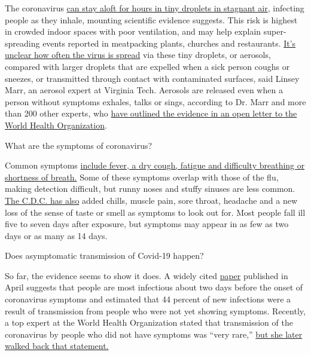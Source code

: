 The coronavirus
\href{https://www.nytimes.com/2020/07/04/health/239-experts-with-one-big-claim-the-coronavirus-is-airborne.html}{can
stay aloft for hours in tiny droplets in stagnant air}, infecting people
as they inhale, mounting scientific evidence suggests. This risk is
highest in crowded indoor spaces with poor ventilation, and may help
explain super-spreading events reported in meatpacking plants, churches
and restaurants.
\href{https://www.nytimes.com/2020/07/06/health/coronavirus-airborne-aerosols.html}{It's
unclear how often the virus is spread} via these tiny droplets, or
aerosols, compared with larger droplets that are expelled when a sick
person coughs or sneezes, or transmitted through contact with
contaminated surfaces, said Linsey Marr, an aerosol expert at Virginia
Tech. Aerosols are released even when a person without symptoms exhales,
talks or sings, according to Dr. Marr and more than 200 other experts,
who
\href{https://academic.oup.com/cid/article/doi/10.1093/cid/ciaa939/5867798}{have
outlined the evidence in an open letter to the World Health
Organization}.

 What are the symptoms of coronavirus?

Common symptoms
\href{https://www.nytimes.com/article/symptoms-coronavirus.html}{include
fever, a dry cough, fatigue and difficulty breathing or shortness of
breath.} Some of these symptoms overlap with those of the flu, making
detection difficult, but runny noses and stuffy sinuses are less common.
\href{https://www.nytimes.com/2020/04/27/health/coronavirus-symptoms-cdc.html}{The
C.D.C. has also} added chills, muscle pain, sore throat, headache and a
new loss of the sense of taste or smell as symptoms to look out for.
Most people fall ill five to seven days after exposure, but symptoms may
appear in as few as two days or as many as 14 days.

 Does asymptomatic transmission of Covid-19 happen?

So far, the evidence seems to show it does. A widely cited
\href{https://www.nature.com/articles/s41591-020-0869-5}{paper}
published in April suggests that people are most infectious about two
days before the onset of coronavirus symptoms and estimated that 44
percent of new infections were a result of transmission from people who
were not yet showing symptoms. Recently, a top expert at the World
Health Organization stated that transmission of the coronavirus by
people who did not have symptoms was ``very rare,''
\href{https://www.nytimes.com/2020/06/09/world/coronavirus-updates.html\#link-1f302e21}{but
she later walked back that statement.}

